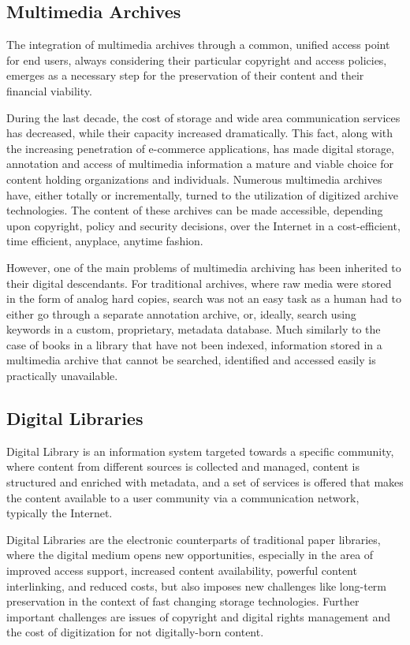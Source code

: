  \subsection{Multimedia Archives}
 The integration of multimedia archives through a common, unified access point for end users, always considering their particular copyright and access policies, emerges as a necessary step for the preservation of their content and their financial viability.
 
 During the last decade, the cost of storage and wide area communication services has decreased, while their capacity increased dramatically. This fact, along with the increasing penetration of e-commerce applications, has made digital storage, annotation and access of multimedia information a mature and viable choice for content holding organizations and individuals. Numerous multimedia archives have, either totally or incrementally, turned to the utilization of digitized archive technologies. The content of these archives can be made accessible, depending upon copyright, policy and security decisions, over the Internet in a cost-efficient, time efficient, anyplace, anytime fashion.
 
 However, one of the main problems of multimedia archiving has been inherited to their digital descendants. For traditional archives, where raw  media were stored in the form of analog hard copies, search was not an easy task as a human had to either go through a separate annotation archive, or, ideally, search using keywords in a custom, proprietary, metadata database. Much similarly to the case of books in a library that have not been indexed, information stored in a multimedia archive that cannot be searched, identified and accessed easily is practically unavailable.
 
 

\subsection{Digital Libraries}
 Digital Library is an information system targeted towards a specific community, where content from different sources is collected and managed, content is structured and enriched with metadata, and a set of services is offered that makes the content available to a user community via a communication network, typically the Internet.

 Digital Libraries are the electronic counterparts of traditional paper libraries, where the digital medium opens new opportunities, especially in the area of improved access support, increased content availability, powerful content interlinking, and reduced costs, but also imposes new challenges like long-term preservation in the context of fast changing storage technologies. Further important challenges are issues of copyright and digital rights management and the cost of digitization for not digitally-born content.
 
